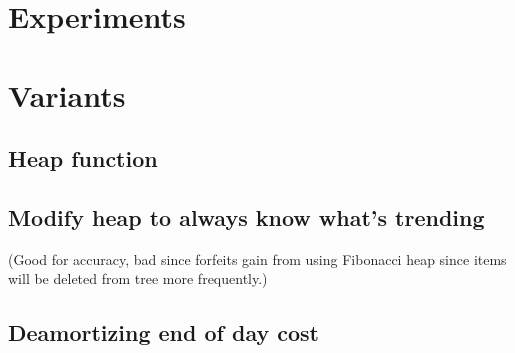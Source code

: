 \documentclass[a4paper,12pt]{article}
\begin{document}
\section{Experiments}

\section{Variants}

\subsection{Heap function}

\subsection{Modify heap to always know what's trending}

(Good for accuracy, bad since forfeits gain from using Fibonacci heap since items will be deleted from tree more frequently.)

\subsection{Deamortizing end of day cost}
\end{document}
